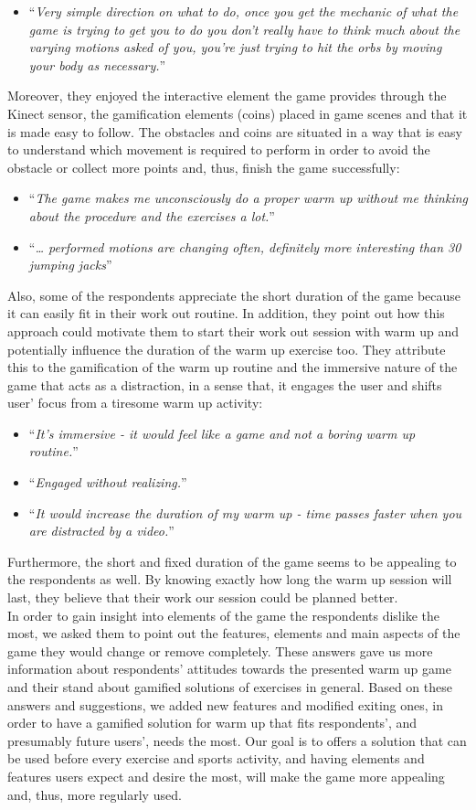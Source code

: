 \begin{itemize}
\item ``\textit{Very simple direction on what to do, once you get the mechanic of what the game is trying to get you to do you don't really have to think much about the varying motions asked of you, you're just trying to hit the orbs by moving your body as necessary.}''
\end{itemize} 
Moreover, they enjoyed the interactive element the game provides through the Kinect sensor, the gamification elements (coins) placed in game scenes and that it is made easy to follow. The obstacles and coins are situated in a way that is easy to understand which movement is required to perform in order to avoid the obstacle or collect more points and, thus, finish the game successfully:
\begin{itemize}
\item ``\textit{The game makes me unconsciously do a proper warm up without me thinking about the procedure and the exercises a lot.}''
\item ``\textit{… performed motions are changing often, definitely more interesting than 30 jumping jacks}''
\end{itemize} 
Also, some of the respondents appreciate the short duration of the game because it can easily fit in their work out routine. In addition, they point out how this approach could motivate them to start their work out session with warm up and potentially influence the duration of the warm up exercise too. They attribute this to the gamification of the warm up routine and the immersive nature of the game that acts as a distraction, in a sense that, it engages the user and shifts user' focus from a tiresome warm up activity:  
\begin{itemize}
\item ``\textit{It's immersive - it would feel like a game and not a boring warm up routine.}''
\item ``\textit{Engaged without realizing.}''
\item ``\textit{It would increase the duration of my warm up - time passes faster when you are distracted by a video.}''
\end{itemize} 
Furthermore, the short and fixed duration of the game seems to be appealing to the respondents as well. By knowing exactly how long the warm up session will last, they believe that their work our session could be planned better.\\
In order to gain insight into elements of the game the respondents dislike the most, we asked them to point out the features, elements and main aspects of the game they would change or remove completely. These answers gave us more information about respondents' attitudes towards the presented warm up game and their stand about gamified solutions of exercises in general. Based on these answers and suggestions, we added new features and modified exiting ones, in order to have a gamified solution for warm up that fits respondents', and presumably future users', needs the most. Our goal is to offers a solution that can be used before every exercise and sports activity, and having elements and features users expect and desire the most, will make the game more appealing and, thus, more regularly used.
